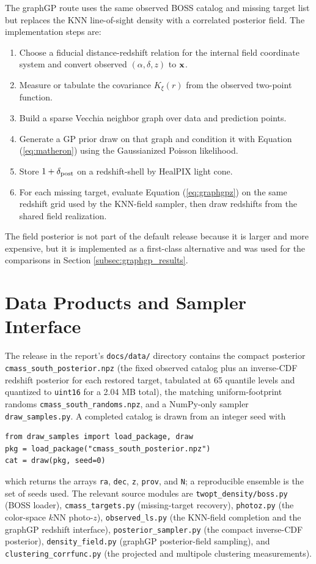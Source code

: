\documentclass[apj]{emulateapj}
\begin{document}
The graphGP route uses the same observed BOSS catalog and missing target list
but replaces the KNN line-of-sight density with a correlated posterior field.
The implementation steps are:
\begin{enumerate}
\item Choose a fiducial distance-redshift relation for the internal field
coordinate system and convert observed $(\alpha,\delta,z)$ to
${\bf x}$.
\item Measure or tabulate the covariance $K_\xi(r)$ from the observed
two-point function.
\item Build a sparse Vecchia neighbor graph over data and prediction points.
\item Generate a GP prior draw on that graph and condition it with
Equation (\ref{eq:matheron}) using the Gaussianized Poisson likelihood.
\item Store $1+\delta_{\rm post}$ on a redshift-shell by HealPIX light cone.
\item For each missing target, evaluate Equation (\ref{eq:graphgpz}) on the
same redshift grid used by the KNN-field sampler, then draw redshifts from the
shared field realization.
\end{enumerate}
The field posterior is not part of the default release because it is larger
and more expensive, but it is implemented as a first-class alternative and was
used for the comparisons in Section \ref{subsec:graphgp_results}.

\section{Data Products and Sampler Interface}
\label{app:products}

The release in the report's \texttt{docs/data/} directory contains the compact
posterior \texttt{cmass\_south\_posterior.npz} (the fixed observed catalog plus
an inverse-CDF redshift posterior for each restored target, tabulated at 65
quantile levels and quantized to \texttt{uint16} for a 2.04 MB total), the
matching uniform-footprint randoms \texttt{cmass\_south\_randoms.npz}, and a
NumPy-only sampler \texttt{draw\_samples.py}.  A completed catalog is drawn from an integer
seed with
\begin{verbatim}
from draw_samples import load_package, draw
pkg = load_package("cmass_south_posterior.npz")
cat = draw(pkg, seed=0)
\end{verbatim}
which returns the arrays \texttt{ra}, \texttt{dec}, \texttt{z}, \texttt{prov},
and \texttt{N}; a reproducible ensemble is the set of seeds used.  The relevant
source modules are \texttt{twopt\_density/boss.py} (BOSS loader),
\texttt{cmass\_targets.py} (missing-target recovery), \texttt{photoz.py} (the
color-space $k$NN photo-$z$), \texttt{observed\_ls.py} (the KNN-field completion
and the graphGP redshift interface), \texttt{posterior\_sampler.py} (the compact
inverse-CDF posterior), \texttt{density\_field.py} (graphGP posterior-field
sampling), and \texttt{clustering\_corrfunc.py} (the projected and multipole
clustering measurements).
\end{document}
